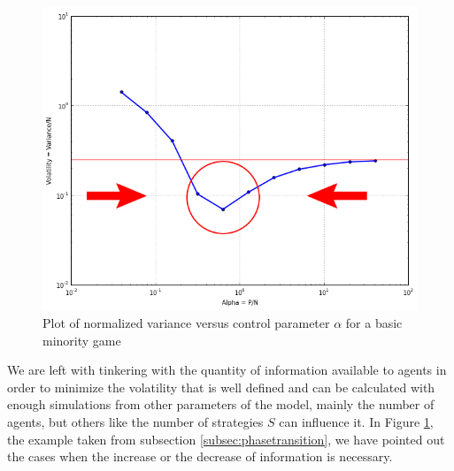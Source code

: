 \begin{figure}[h]
\begin{center}
\includegraphics[scale=0.4]{images/results/alpha_to_norm_var2.png}
\caption{Plot of normalized variance versus control parameter $\alpha$ for a basic minority game}
\label{fig:normalized variance spacetime}
\end{center}
\end{figure}

We are left with tinkering with the quantity of information available to agents in order to minimize the volatility that is well defined and can be calculated with enough simulations from other parameters of the model, mainly the number of agents, but others like the number of strategies $S$ can influence it.
In Figure \ref{fig:normalized variance spacetime}, the example taken from subsection \ref{subsec:phasetransition}, we have pointed out the cases when the increase or the decrease of information is necessary.

